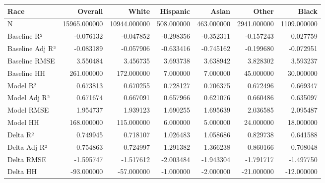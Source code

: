 \begin{tabular}{lrrrrrr}
\toprule
Race &       Overall &         White &    Hispanic &       Asian &        Other &        Black \\
\midrule
N               &  15965.000000 &  10944.000000 &  508.000000 &  463.000000 &  2941.000000 &  1109.000000 \\
Baseline R²     &     -0.076132 &     -0.047852 &   -0.298356 &   -0.352311 &    -0.157243 &     0.027759 \\
Baseline Adj R² &     -0.083189 &     -0.057906 &   -0.633416 &   -0.745162 &    -0.199680 &    -0.072951 \\
Baseline RMSE   &      3.550484 &      3.456735 &    3.693738 &    3.638942 &     3.828302 &     3.593237 \\
Baseline HH     &    261.000000 &    172.000000 &    7.000000 &    7.000000 &    45.000000 &    30.000000 \\
Model R²        &      0.673813 &      0.670255 &    0.728127 &    0.706375 &     0.672496 &     0.669347 \\
Model Adj R²    &      0.671674 &      0.667091 &    0.657966 &    0.621076 &     0.660486 &     0.635097 \\
Model RMSE      &      1.954737 &      1.939123 &    1.690255 &    1.695639 &     2.036585 &     2.095487 \\
Model HH        &    168.000000 &    115.000000 &    6.000000 &    5.000000 &    24.000000 &    18.000000 \\
Delta R²        &      0.749945 &      0.718107 &    1.026483 &    1.058686 &     0.829738 &     0.641588 \\
Delta Adj R²    &      0.754863 &      0.724997 &    1.291382 &    1.366238 &     0.860166 &     0.708048 \\
Delta RMSE      &     -1.595747 &     -1.517612 &   -2.003484 &   -1.943304 &    -1.791717 &    -1.497750 \\
Delta HH        &    -93.000000 &    -57.000000 &   -1.000000 &   -2.000000 &   -21.000000 &   -12.000000 \\
\bottomrule
\end{tabular}
